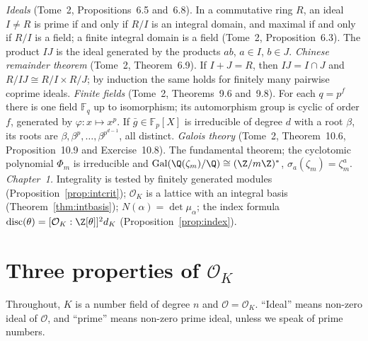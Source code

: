 \begin{reminder}
\emph{Ideals} (Tome~2, Propositions~6.5 and~6.8). In a commutative ring $R$, an ideal $I\ne R$ is prime if and only if
$R/I$ is an integral domain, and maximal if and only if $R/I$ is a field; a finite integral domain is a field (Tome~2,
Proposition~6.3). The product $IJ$ is the ideal generated by the products $ab$, $a\in I$, $b\in J$.
\emph{Chinese remainder theorem} (Tome~2, Theorem~6.9). If $I+J=R$, then $IJ=I\cap J$ and $R/IJ\cong R/I\times R/J$; by
induction the same holds for finitely many pairwise coprime ideals.
\emph{Finite fields} (Tome~2, Theorems~9.6 and~9.8). For each $q=p^f$ there is one field $\mathbb F_q$ up to isomorphism;
its automorphism group is cyclic of order $f$, generated by $\varphi:x\mapsto x^p$. If $\bar g\in\mathbb F_p[X]$ is
irreducible of degree $d$ with a root $\beta$, its roots are $\beta,\beta^p,\dots,\beta^{p^{d-1}}$, all distinct.
\emph{Galois theory} (Tome~2, Theorem~10.6, Proposition~10.9 and Exercise~10.8). The fundamental theorem; the cyclotomic
polynomial $\Phi_m$ is irreducible and $\operatorname{Gal}(\Q(\zeta_m)/\Q)\cong(\Z/m\Z)^*$, $\sigma_a(\zeta_m)=\zeta_m^a$.
\emph{Chapter~1.} Integrality is tested by finitely generated modules (Proposition~\ref{prop:intcrit}); $\mathcal O_K$
is a lattice with an integral basis (Theorem~\ref{thm:intbasis}); $N(\alpha)=\det\mu_\alpha$; the index formula
$\operatorname{disc}(\theta)=[\mathcal O_K:\Z[\theta]]^2d_K$ (Proposition~\ref{prop:index}).
\end{reminder}

\section{Three properties of $\mathcal O_K$}

Throughout, $K$ is a number field of degree $n$ and $\mathcal O=\mathcal O_K$. ``Ideal'' means non-zero ideal of
$\mathcal O$, and ``prime'' means non-zero prime ideal, unless we speak of prime numbers.

